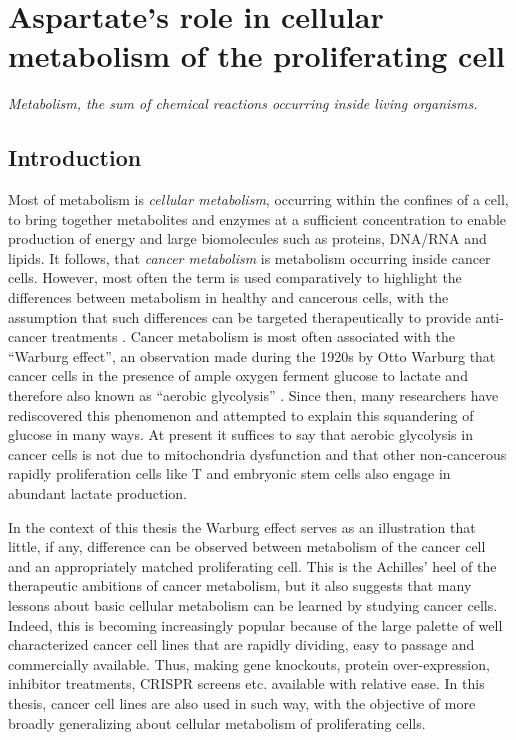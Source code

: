 \chapter{Aspartate's role in cellular metabolism of the proliferating cell}
\label{chap1}
\textit{Metabolism, the sum of chemical reactions occurring inside living organisms.}

\section{Introduction}
Most of metabolism is \textit{cellular metabolism}, occurring within the confines of a cell, to bring together metabolites and enzymes at a sufficient concentration to enable production of energy and large biomolecules such as proteins, DNA/RNA and lipids.
It follows, that \textit{cancer metabolism} is metabolism occurring inside cancer cells.
However, most often the term is used comparatively to highlight the differences between metabolism in healthy and cancerous cells, with the assumption that such differences can be targeted therapeutically to provide anti-cancer treatments \cite{Vander_Heiden2011-ce, Hamanaka2012-kw, Luengo2017-kf, Vasan2020-yr}.
Cancer metabolism is most often associated with the ``Warburg effect'', an observation made during the 1920s by Otto Warburg that cancer cells in the presence of ample oxygen ferment glucose to lactate and therefore also known as ``aerobic glycolysis'' \cite{warburg1926stoffwechsel, Chandel2021-rf}.
Since then, many researchers have rediscovered this phenomenon and attempted to explain this squandering of glucose in many ways.
At present it suffices to say that aerobic glycolysis in cancer cells is not due to mitochondria dysfunction and that other non-cancerous rapidly proliferation cells like T and embryonic stem cells also engage in abundant lactate production.

In the context of this thesis the Warburg effect serves as an illustration that little, if any, difference can be observed between metabolism of the cancer cell and an appropriately matched proliferating cell.
This is the Achilles' heel of the therapeutic ambitions of cancer metabolism, but it also suggests that many lessons about basic cellular metabolism can be learned by studying cancer cells.
Indeed, this is becoming increasingly popular because of the large palette of well characterized cancer cell lines that are rapidly dividing, easy to passage and commercially available.
Thus, making gene knockouts, protein over-expression, inhibitor treatments, CRISPR screens etc. available with relative ease.
In this thesis, cancer cell lines are also used in such way, with the objective of more broadly generalizing about cellular metabolism of proliferating cells.



